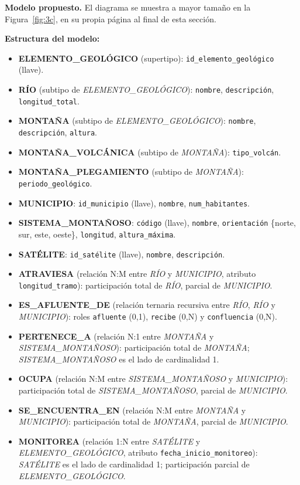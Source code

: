\textbf{Modelo propuesto.} El diagrama se muestra a mayor tamaño en la Figura~\ref{fig:3c}, en su propia página al final de esta sección.

\textbf{Estructura del modelo:}

\begin{itemize}
	\item \textbf{ELEMENTO\_GEOLÓGICO} (supertipo): \texttt{id\_elemento\_geológico} (llave).
	\item \textbf{RÍO} (subtipo de \textit{ELEMENTO\_GEOLÓGICO}): \texttt{nombre}, \texttt{descripción}, \texttt{longitud\_total}.
	\item \textbf{MONTAÑA} (subtipo de \textit{ELEMENTO\_GEOLÓGICO}): \texttt{nombre}, \texttt{descripción}, \texttt{altura}.
	\item \textbf{MONTAÑA\_VOLCÁNICA} (subtipo de \textit{MONTAÑA}): \texttt{tipo\_volcán}.
	\item \textbf{MONTAÑA\_PLEGAMIENTO} (subtipo de \textit{MONTAÑA}): \texttt{periodo\_geológico}.
	\item \textbf{MUNICIPIO}: \texttt{id\_municipio} (llave), \texttt{nombre}, \texttt{num\_habitantes}.
	\item \textbf{SISTEMA\_MONTAÑOSO}: \texttt{código} (llave), \texttt{nombre}, \texttt{orientación} \{norte, sur, este, oeste\}, \texttt{longitud}, \texttt{altura\_máxima}.
	\item \textbf{SATÉLITE}: \texttt{id\_satélite} (llave), \texttt{nombre}, \texttt{descripción}.
	\item \textbf{ATRAVIESA} (relación N:M entre \textit{RÍO} y \textit{MUNICIPIO}, atributo \texttt{longitud\_tramo}): participación total de \textit{RÍO}, parcial de \textit{MUNICIPIO}.
	\item \textbf{ES\_AFLUENTE\_DE} (relación ternaria recursiva entre \textit{RÍO}, \textit{RÍO} y \textit{MUNICIPIO}): roles \texttt{afluente} (0,1), \texttt{recibe} (0,N) y \texttt{confluencia} (0,N).
	\item \textbf{PERTENECE\_A} (relación N:1 entre \textit{MONTAÑA} y \textit{SISTEMA\_MONTAÑOSO}): participación total de \textit{MONTAÑA}; \textit{SISTEMA\_MONTAÑOSO} es el lado de cardinalidad 1.
	\item \textbf{OCUPA} (relación N:M entre \textit{SISTEMA\_MONTAÑOSO} y \textit{MUNICIPIO}): participación total de \textit{SISTEMA\_MONTAÑOSO}, parcial de \textit{MUNICIPIO}.
	\item \textbf{SE\_ENCUENTRA\_EN} (relación N:M entre \textit{MONTAÑA} y \textit{MUNICIPIO}): participación total de \textit{MONTAÑA}, parcial de \textit{MUNICIPIO}.
	\item \textbf{MONITOREA} (relación 1:N entre \textit{SATÉLITE} y \textit{ELEMENTO\_GEOLÓGICO}, atributo \texttt{fecha\_inicio\_monitoreo}): \textit{SATÉLITE} es el lado de cardinalidad 1; participación parcial de \textit{ELEMENTO\_GEOLÓGICO}.
\end{itemize}

